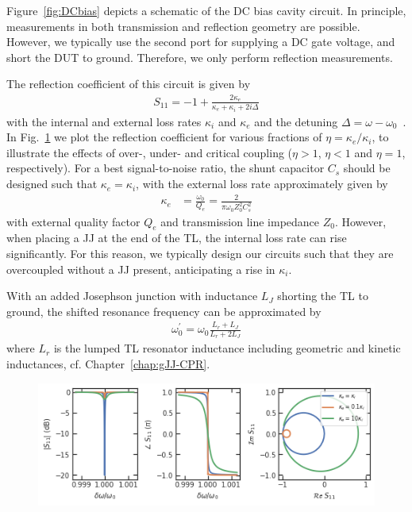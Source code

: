 Figure~\ref{fig:DCbias} depicts a schematic of the DC bias cavity circuit.
%
In principle, measurements in both transmission and reflection geometry are possible.
%
However, we typically use the second port for supplying a DC gate voltage, and short the DUT to ground.
%
Therefore, we only perform reflection measurements.

The reflection coefficient of this circuit is given by
%
\begin{align}
S_{11}=-1+\frac{2\kappa_e}{\kappa_e+\kappa_i+2i\Delta}
\end{align}
%
with the internal and external loss rates $\kappa_i$ and $\kappa_e$ and the detuning $\Delta=\omega-\omega_0$~\cite{bosmanBroadbandArchitectureGalvanically2015c}.
%
In Fig.~\ref{fig:s11} we plot the reflection coefficient for various fractions of $\eta=\kappa_e/\kappa_i$, to illustrate the effects of over-, under- and critical coupling ($\eta>1$, $\eta<1$ and $\eta=1$, respectively).
%
For a best signal-to-noise ratio, the shunt capacitor $C_s$ should be designed such that $\kappa_e=\kappa_i$, with the external loss rate approximately given by
%
\begin{align}
\kappa_e &= \frac{\omega_0}{Q_e} = \frac{2}{\pi\omega_0Z_0^2C_s^2}
\end{align}
%
with external quality factor $Q_e$ and transmission line impedance $Z_0$.
%
However, when placing a JJ at the end of the TL, the internal loss rate can rise significantly.
%
For this reason, we typically design our circuits such that they are overcoupled without a JJ present, anticipating a rise in $\kappa_i$.

With an added Josephson junction with inductance $L_J$ shorting the TL to ground, the shifted resonance frequency can be approximated by
%
\begin{align}
\omega_0^\prime = \omega_0\frac{L_r+L_J}{L_r+2L_J}
\end{align}
%
where $L_r$ is the lumped TL resonator inductance including geometric and kinetic inductances, cf. Chapter~\ref{chap:gJJ-CPR}.


\begin{figure}
	\centering
	\includegraphics[width=\linewidth]{chapter-introduction/figs/S11}
	\caption{}
	\label{fig:s11}
\end{figure}


